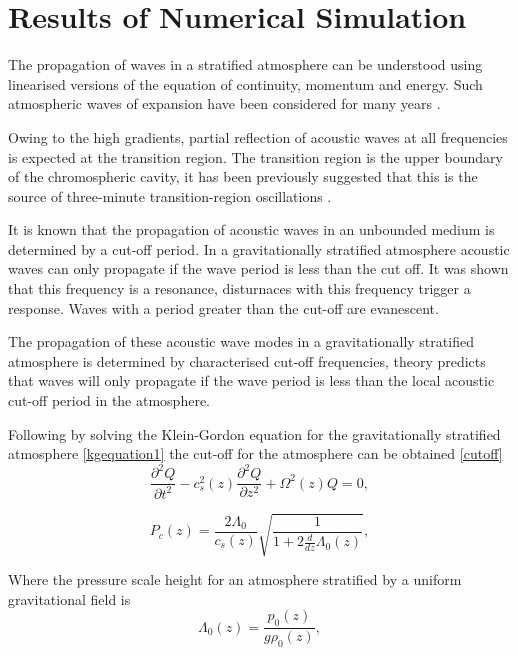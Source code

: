 \documentclass[authoryear,final,1p]{elsarticle}
\begin{document}
\section{Results of Numerical Simulation}

The propagation of waves in a stratified atmosphere can be understood using linearised versions of the equation of continuity, momentum and energy. Such atmospheric waves of expansion have been considered for many years \citet{Lamb1932}.

Owing to the high gradients, partial reflection of acoustic waves at all frequencies is expected at the transition region. The transition region is the upper boundary of the chromospheric cavity, it has been previously suggested that this is the source of three-minute transition-region oscillations \citet{Leibacher1971}.

It is known that the propagation of acoustic waves in an unbounded medium is determined by a cut-off period. In a gravitationally stratified atmosphere acoustic waves can only propagate if the wave period is less than the cut off. It was shown that this frequency is a resonance, disturnaces with this frequency trigger a response. Waves with a period greater than the cut-off are evanescent.

The propagation of these acoustic wave modes in a gravitationally stratified atmosphere is determined by characterised cut-off frequencies, theory predicts that waves will only propagate if the wave period is less than the local acoustic cut-off period in the atmosphere.

Following \citet{Taroyan2008} by solving the Klein-Gordon equation for the gravitationally stratified atmosphere \eqref{kgequation1} the cut-off for the atmosphere can be obtained \eqref{cutoff}
\begin{equation}\label{kgequation1}
\frac{\partial^2 Q}{\partial t^2} - c_s^2(z) \frac{\partial^2 Q}{\partial z^2} + \Omega^2(z)Q = 0 ,
\end{equation}

\begin{equation}\label{cutoff}
P_{c}(z)=\frac{   2\Lambda_0   }{ c_{s}(z)}   \sqrt{\frac{1}{1+2\frac{d}{dz}\Lambda_0(z)}} ,
\end{equation}

Where the pressure scale height for an atmosphere stratified by a uniform gravitational field is
\begin{equation}\label{lambda0}
\Lambda_0(z)=\frac{p_0(z)}{g\rho_0(z)} ,
\end{equation}
\end{document}
